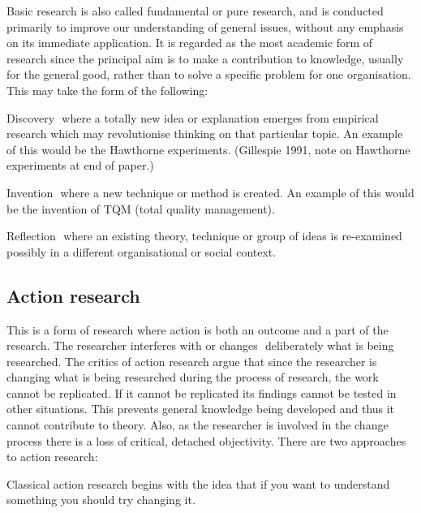 \documentclass[12pt, a4paper]{report}
\begin{document}
Basic research is also called fundamental or pure research, and is conducted primarily to improve our understanding of general issues, without any emphasis on its immediate application. It is regarded as the most academic form of research since the principal aim is to make a contribution to knowledge, usually for the general good, rather than to solve a specific problem for one organisation. This may take the form of the following:

Discovery  where a totally new idea or explanation emerges from empirical research which may revolutionise thinking on that particular topic. An example of this would be the Hawthorne experiments. (Gillespie 1991, note on Hawthorne experiments at end of paper.)

Invention  where a new technique or method is created. An example of this would be the invention of TQM (total quality management).

Reflection  where an existing theory, technique or group of ideas is re-examined possibly in a different organisational or social context.

\subsection{Action research}
This is a form of research where action is both an outcome and a part of the research. The researcher interferes with or changes  deliberately  what is being researched. The critics of action research argue that since the researcher is changing what is being researched during the process of research, the work cannot be replicated. If it cannot be replicated its findings cannot be tested in other situations. This prevents general knowledge being developed and thus it cannot contribute to theory. Also, as the researcher is involved in the change process there is a loss of critical, detached objectivity. There are two approaches to action research:

Classical action research begins with the idea that if you want to understand something you should try changing it.
\end{document}
